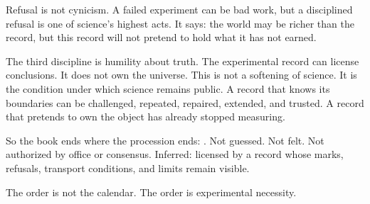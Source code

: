 Refusal is not cynicism. A failed experiment can be bad work, but a disciplined
refusal is one of science's highest acts. It says: the world may be richer than
the record, but this record will not pretend to hold what it has not earned.

The third discipline is humility about truth. The experimental record can
license conclusions. It does not own the universe. This is not a softening of
science. It is the condition under which science remains public. A record that
knows its boundaries can be challenged, repeated, repaired, extended, and
trusted. A record that pretends to own the object has already stopped measuring.

So the book ends where the procession ends: . Not guessed. Not
felt. Not authorized by office or consensus. Inferred: licensed by a record
whose marks, refusals, transport conditions, and limits remain visible.

The order is not the calendar. The order is experimental necessity.
